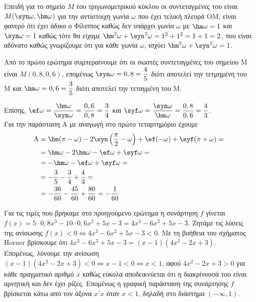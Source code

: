 \documentclass[11pt,a4paper,twoside]{book}
\begin{document}
\begin{alist}
\item Επειδή για το σημείο $M$ του τριγωνομετρικού κύκλου οι συντεταγμένες του είναι $M(\syn \omega, \hm \omega)$ για την αντίστοιχη γωνία $\omega$ που έχει τελική πλευρά OM, είναι φανερό ότι έχει άδικο ο Φίλιππος καθώς δεν υπάρχει γωνία $\omega$ με $\hm \omega = 1$ και $\syn \omega = 1$ καθώς τότε θα είχαμε $\hm ^2\omega + \syn ^2\omega = 1^2 + 1^2 = 1+1 = 2$, που είναι αδύνατο καθώς γνωρίζουμε ότι για κάθε γωνία $\omega$, ισχύει $\hm ^2\omega + \syn ^2\omega = 1$.
\item 
\begin{rlist}
\item Από το πρώτο ερώτημα συμπεραίνουμε ότι οι σωστές συντεταγμένες του σημείου M είναι $M(0,8, 0,6)$, επομένως $\syn \omega = 0,8 = \dfrac{4}{5}$ διότι αποτελεί την τετμημένη του M και $\hm \omega = 0,6 = \dfrac{3}{5}$ διότι αποτελεί την τεταγμένη του M.
\item Επίσης, $\ef \omega = \dfrac{\hm \omega}{\syn \omega} = \dfrac{0,6}{0,8} = \dfrac{3}{4}$ και $\syf \omega = \dfrac{\syn \omega}{\hm \omega} = \dfrac{0,8}{0,6} = \dfrac{4}{3}$. \\
Για την παράσταση A με αναγωγή στο πρώτο τεταρτημόριο έχουμε
\begin{align*}
\text{A} &= \hm (\pi-\omega) - 2\syn \left(\frac{\pi}{2}-\omega\right) + \ef (-\omega) + \syf (\pi+\omega) = \\
&= \hm \omega - 2\hm \omega - \ef \omega + \syf \omega = \\
&= -\hm \omega - \ef \omega + \syf \omega = \\
&= -\frac{3}{5} - \frac{3}{4} + \frac{4}{3} = \\
&= -\frac{36}{60} - \frac{45}{60} + \frac{80}{60} = -\frac{1}{60}
\end{align*}
\end{rlist}
\item Για τις τιμές που βρήκαμε στο προηγούμενο ερώτημα η συνάρτηση $f$ γίνεται $f(x) = 5\cdot 0,8x^3 - 10\cdot 0,6x^2 + 5x - 3 = 4x^3 - 6x^2 + 5x - 3$. Ζητάμε τις λύσεις της ανίσωσης $f(x) < 0 \Leftrightarrow 4x^3 - 6x^2 + 5x - 3 < 0$. Με τη βοήθεια του σχήματος Horner βρίσκουμε ότι $4x^3 - 6x^2 + 5x - 3 = (x-1)(4x^2 - 2x + 3)$. \\
Επομένως, λύνουμε την ανίσωση $(x-1)(4x^2 - 2x + 3) < 0 \Leftrightarrow x-1 < 0 \Leftrightarrow x < 1$, αφού $4x^2 - 2x + 3 > 0$ για κάθε πραγματικό αριθμό $x$ καθώς εύκολα αποδεικνύεται ότι η διακρίνουσά του είναι αρνητική και δεν έχει ρίζες. Επομένως η γραφική παράσταση της συνάρτησης $f$ βρίσκεται κάτω από τον άξονα $x'x$ όταν $x<1$, δηλαδή στο διάστημα $(-\infty, 1)$.
\end{alist}
\end{document}
